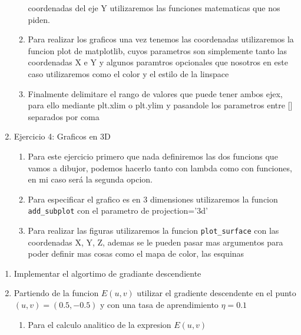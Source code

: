 \documentclass[12pt]{article}
\begin{document}
\begin{enumerate}
\begin{enumerate}
    coordenadas del eje Y utilizaremos las funciones matematicas que nos piden.
    \item[] Para realizar los graficos una vez tenemos las coordenadas utilizaremos la funcion plot de matplotlib, cuyos parametros son simplemente tanto las coordenadas X e Y y algunos paramtros opcionales que nosotros en este caso utilizaremos como el color y el estilo de la linspace
    \item[] Finalmente delimitare el rango de valores que puede tener ambos ejex, para ello mediante plt.xlim o plt.ylim y pasandole los parametros entre [] separados por coma
  \end{enumerate} 
  \item[] Ejercicio 4: Graficos en 3D
  \begin{enumerate}
    \item[] Para este ejercicio primero que nada definiremos las dos funcions que vamos a dibujor, podemos hacerlo tanto con lambda como con funciones, en mi caso será la segunda opcion.
    \item[] Para especificar el grafico es en 3 dimensiones utilizaremos la funcion \verb|add_subplot| con el parametro de projection='3d'
    \item[] Para realizar las figuras utilizaremos la funcion \verb|plot_surface| con las coordenadas X, Y, Z, ademas se le pueden pasar mas argumentos para poder definir mas cosas como el mapa de color, las esquinas 
  \end{enumerate} 
\end{enumerate}

\begin{enumerate}
  \item[] Implementar el algortimo de gradiante descendiente
  \item[] Partiendo de la funcion $E(u,v)$ utilizar el gradiente descendente en el punto $(u,v) = (0.5, -0.5)$ y con una tasa de aprendimiento $\eta = 0.1$

  \begin{enumerate}
    \item[] Para el calculo analitico de la expresion $E(u,v)$ 
  \end{enumerate}    
\end{enumerate}
\end{document}
